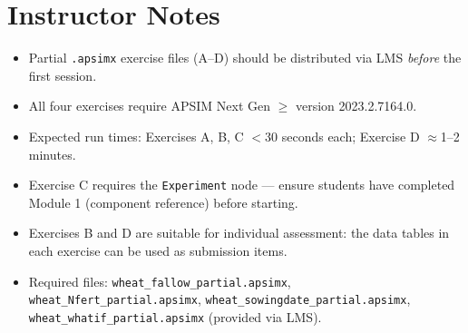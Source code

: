 
\chapter{Instructor Notes}

\begin{itemize}
  \item Partial \texttt{.apsimx} exercise files (A--D) should be distributed
        via LMS \emph{before} the first session.
  \item All four exercises require APSIM Next Gen $\geq$ version 2023.2.7164.0.
  \item Expected run times: Exercises A, B, C $<$30 seconds each;
        Exercise D $\approx$1--2 minutes.
  \item Exercise C requires the \texttt{Experiment} node --- ensure students
        have completed Module 1 (component reference) before starting.
  \item Exercises B and D are suitable for individual assessment: the data tables
        in each exercise can be used as submission items.
  \item Required files: \texttt{wheat\_fallow\_partial.apsimx},
        \texttt{wheat\_Nfert\_partial.apsimx},
        \texttt{wheat\_sowingdate\_partial.apsimx},
        \texttt{wheat\_whatif\_partial.apsimx} (provided via LMS).
\end{itemize}



